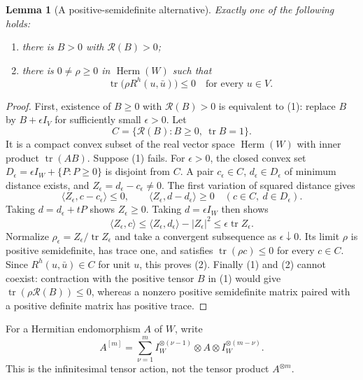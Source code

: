 \documentclass[12pt]{amsart}
\newtheorem{lem}[thm]{Lemma}
\theoremstyle{definition}
\theoremstyle{remark}
\numberwithin{equation}{section}
\DeclareMathOperator{\tr}{tr}
\theoremstyle{definition}
\begin{document}
\begin{lem}[A positive-semidefinite alternative]\label{en:alternative}
Exactly one of the following holds:
\begin{enumerate}
\item there is $B>0$ with $\mathcal R(B)>0$;
\item there is $0\ne\rho\geq0$ in $\operatorname{Herm}(W)$ such that
\begin{equation}\label{en:obstruction}
 \tr\bigl(\rho R^h(u,\bar u)\bigr)\leq0\quad\text{for every }u\in V.
\end{equation}
\end{enumerate}
\end{lem}
\begin{proof}
First, existence of $B\geq0$ with $\mathcal R(B)>0$ is equivalent to
(1): replace $B$ by $B+\epsilon I_V$ for sufficiently small
$\epsilon>0$. Let
\[
 C=\{\mathcal R(B):B\geq0,\ \tr B=1\}.
\]
It is a compact convex subset of the real vector space
$\operatorname{Herm}(W)$ with inner product $\tr(AB)$. Suppose (1)
fails. For $\epsilon>0$, the closed convex set
$D_\epsilon=\epsilon I_W+\{P:P\geq0\}$ is disjoint from $C$.
A pair $c_\epsilon\in C$, $d_\epsilon\in D_\epsilon$ of minimum
distance exists, and $Z_\epsilon=d_\epsilon-c_\epsilon\ne0$.
The first variation of squared distance gives
\[
 \langle Z_\epsilon,c-c_\epsilon\rangle\leq0,\qquad
 \langle Z_\epsilon,d-d_\epsilon\rangle\geq0
 \quad(c\in C,\ d\in D_\epsilon).
\]
Taking $d=d_\epsilon+tP$ shows $Z_\epsilon\geq0$. Taking
$d=\epsilon I_W$ then shows
\[
 \langle Z_\epsilon,c\rangle\leq
 \langle Z_\epsilon,d_\epsilon\rangle-|Z_\epsilon|^2
 \leq\epsilon\tr Z_\epsilon.
\]
Normalize $\rho_\epsilon=Z_\epsilon/\tr Z_\epsilon$ and take a
convergent subsequence as $\epsilon\downarrow0$. Its limit $\rho$ is
positive semidefinite, has trace one, and satisfies
$\tr(\rho c)\leq0$ for every $c\in C$. Since $R^h(u,\bar u)\in C$
for unit $u$, this proves (2). Finally (1) and (2) cannot coexist:
contraction with the positive tensor $B$ in (1) would give
$\tr(\rho\mathcal R(B))\leq0$, whereas a nonzero positive
semidefinite matrix paired with a positive definite matrix has positive
trace.
\end{proof}

For a Hermitian endomorphism $A$ of $W$, write
\[
 A^{[m]}=\sum_{\nu=1}^m
 I_W^{\otimes(\nu-1)}\otimes A\otimes
 I_W^{\otimes(m-\nu)}.
\]
This is the infinitesimal tensor action, not the tensor product $A^{\otimes m}$.
\end{document}
